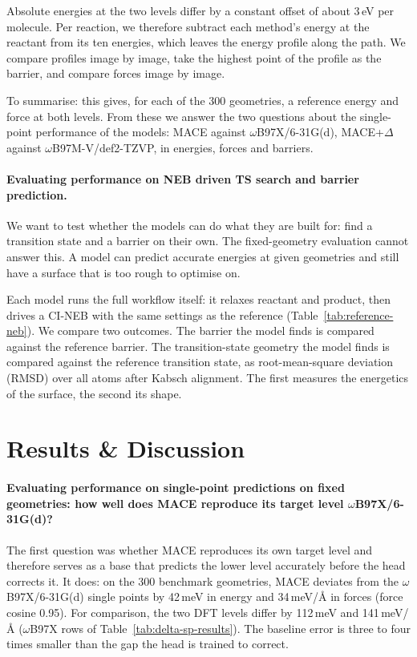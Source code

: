 Absolute energies at the two levels differ by a constant offset of
about 3\,eV per molecule. Per reaction, we therefore subtract each
method's energy at the reactant from its ten energies, which leaves
the energy profile along the path. We compare profiles image by image,
take the highest point of the profile as the barrier, and compare
forces image by image.

To summarise: this gives, for each of the 300 geometries, a reference
energy and force at both levels. From these we answer the two
questions about the single-point performance of the models: MACE
against \mbox{$\omega$B97X/6-31G(d)}, MACE+$\Delta$ against
\mbox{$\omega$B97M-V/def2-TZVP}, in energies, forces and barriers.

\paragraph{Evaluating performance on NEB driven TS search and barrier prediction.}
We want to test whether the models can do what they are built for: find a transition
state and a barrier on their own. The fixed-geometry evaluation cannot answer this. A model can predict accurate energies at
given geometries and still have a surface that is too rough to optimise on.

Each model runs the full workflow itself: it relaxes reactant and product,
then drives a CI-NEB with the same settings as the reference
(Table~\ref{tab:reference-neb}). We compare two outcomes. The barrier the
model finds is compared against the reference barrier. The transition-state geometry
the model finds is compared against the reference transition state, as
root-mean-square deviation (RMSD) over all atoms after Kabsch alignment. The first measures the energetics of the
surface, the second its shape.

\section{Results \& Discussion}
\label{sec:delta-results}

\paragraph{Evaluating performance on single-point predictions on fixed geometries: how well does MACE reproduce its target level $\omega$B97X/6-31G(d)?}
The first question was whether MACE reproduces its own target level
and therefore serves as a base that predicts the lower level
accurately before the head corrects it. It does: on the 300 benchmark
geometries, MACE deviates from the $\omega$B97X/6-31G(d)
single points by 42\,meV in energy and 34\,meV/\AA{} in forces (force
cosine 0.95). For comparison, the two DFT levels differ by 112\,meV and
141\,meV/\AA{} ($\omega$B97X rows of Table~\ref{tab:delta-sp-results}). The
baseline error is three to four times smaller than the gap the head is
trained to correct.

